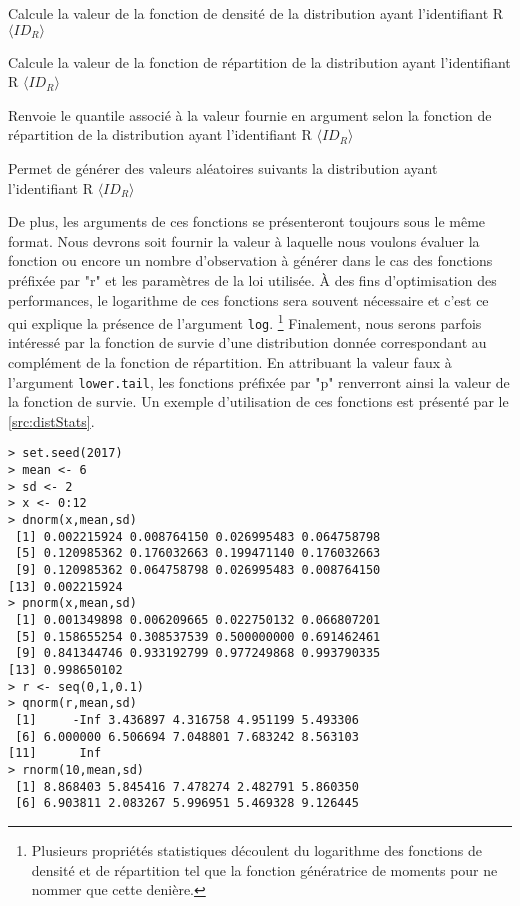 \begin{description}[style=multiline,leftmargin=2cm]
	\item[$d\langle ID_R \rangle$] Calcule la valeur de la fonction de densité de la distribution ayant l'identifiant R $\langle ID_R \rangle$
	\item[$p\langle ID_R \rangle$] Calcule la valeur de la fonction de répartition de la distribution ayant l'identifiant R $\langle ID_R \rangle$
	\item[$q\langle ID_R \rangle$] Renvoie le quantile associé à la valeur fournie en argument selon  la fonction de répartition de la distribution ayant l'identifiant R $\langle ID_R \rangle$
	\item[$r\langle ID_R \rangle$] Permet de générer des valeurs aléatoires suivants la distribution ayant l'identifiant R $\langle ID_R \rangle$
\end{description}

De plus, les arguments de ces fonctions se présenteront toujours sous le même format. Nous devrons soit fournir la valeur à laquelle nous voulons évaluer la fonction ou encore un nombre d'observation à générer dans le cas des fonctions préfixée par "r" et les paramètres de la loi utilisée. À des fins d'optimisation des performances, le logarithme de ces fonctions sera souvent nécessaire et c'est ce qui explique la présence de l'argument \texttt{log}. \footnote{Plusieurs propriétés statistiques découlent du logarithme des fonctions de densité et de répartition tel que la fonction génératrice de moments pour ne nommer que cette denière.} Finalement, nous serons parfois intéressé par la fonction de survie d'une distribution donnée correspondant au complément de la fonction de répartition. En attribuant la valeur faux à l'argument \texttt{lower.tail}, les fonctions préfixée par "p" renverront ainsi la valeur de la fonction de survie. Un exemple d'utilisation de ces fonctions est présenté par le \autoref{src:distStats}. \\

\begin{lstlisting}[caption = Fonctions relatives à la distribution Normale,label=src:distStats]
> set.seed(2017)
> mean <- 6
> sd <- 2
> x <- 0:12
> dnorm(x,mean,sd)
 [1] 0.002215924 0.008764150 0.026995483 0.064758798
 [5] 0.120985362 0.176032663 0.199471140 0.176032663
 [9] 0.120985362 0.064758798 0.026995483 0.008764150
[13] 0.002215924
> pnorm(x,mean,sd)
 [1] 0.001349898 0.006209665 0.022750132 0.066807201
 [5] 0.158655254 0.308537539 0.500000000 0.691462461
 [9] 0.841344746 0.933192799 0.977249868 0.993790335
[13] 0.998650102
> r <- seq(0,1,0.1)
> qnorm(r,mean,sd)
 [1]     -Inf 3.436897 4.316758 4.951199 5.493306
 [6] 6.000000 6.506694 7.048801 7.683242 8.563103
[11]      Inf
> rnorm(10,mean,sd)
 [1] 8.868403 5.845416 7.478274 2.482791 5.860350
 [6] 6.903811 2.083267 5.996951 5.469328 9.126445
\end{lstlisting}

